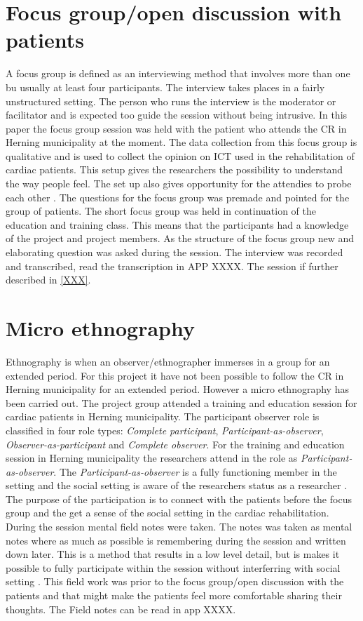 \section {Focus group/open discussion with patients} \label{focusgroup}

A focus group is defined as an interviewing method that involves more than one bu usually at least four participants. The interview takes places in a fairly unstructured setting. The person who runs the interview is the moderator or facilitator and is expected too guide the session without being intrusive. In this paper the focus group session was held with the patient who attends the CR in Herning municipality at the moment. The data collection from this focus group is qualitative and is used to collect the opinion on ICT used in the rehabilitation of cardiac patients. This setup gives the researchers the possibility to understand the way people feel. The set up also gives opportunity for the attendies to probe each other \cite{brymanbell}. 
The questions for the focus group was premade and pointed for the group of patients. The short focus group was held in continuation of the education and training class. This means that the participants had a knowledge of the project and project members.
As the structure of the focus group new and elaborating question was asked during the session. The interview was recorded and transcribed, read the transcription in APP XXXX. The session if further described in \cref{XXX}. 


\section{Micro ethnography} \label{ethnography}
Ethnography is when an observer/ethnographer immerses in a group for an extended period. For this project it have not been possible to follow the CR in Herning municipality for an extended period. However a micro ethnography has been carried out. The project group attended a training and education session for cardiac patients in Herning municipality. The participant observer role is classified in four role types: \textit{Complete participant}, \textit{Participant-as-observer}, \textit{Observer-as-participant} and \textit{Complete observer}. For the training and education session in Herning municipality the researchers attend in the role as \textit{Participant-as-observer}. The \textit{Participant-as-observer} is a fully functioning member in the setting and the social setting is aware of the researchers status as a researcher \cite{gold1958roles}. The purpose of the participation is to connect with the patients before the focus group and the get a sense of the social setting in the cardiac rehabilitation. During the session mental field notes were taken. The notes was taken as mental notes where as much as possible is remembering during the session and written down later. This is a method that results in a low level detail, but is makes it possible to fully participate within the session without interferring with social setting \cite{lofland1995analyzing}. This field work was prior to the focus group/open discussion with the patients and that might make the patients feel more comfortable sharing their thoughts. The Field notes can be read in app XXXX. 

